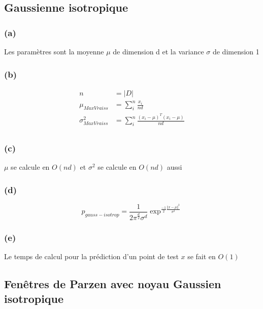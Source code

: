 \documentclass{article}
\begin{document}
	\subsection{Gaussienne isotropique}
	
	\subsubsection*{(a)}
	Les paramètres sont la moyenne $\mu$ de dimension d et la variance $\sigma$ de dimension 1 \\
	
	
	\subsubsection*{(b)}
	\begin{equation}
	\begin{split}
		n &= |D| \\
		\mu_{MaxVraiss} &= \sum_{i}^{n} \frac{x_{i}}{nd} \\
		\sigma_{MaxVraiss}^{2} &= \sum_{i}^{n} \frac{(x_{i}- \mu)^{T}(x_{i} - \mu)}{nd} \\
	\end{split}
	\end{equation}
	
	\subsubsection*{(c)}
	$\mu$ se calcule en $O(nd)$  et $\sigma^{2} $ se calcule en $O(nd)$ aussi\\
	\subsubsection*{(d)}
	
	\begin{equation}
		p_{gauss-isotrop} = 
		\frac{1}{2\pi^{\frac{d}{2}}\sigma^d}\exp^{\frac{-1}{2}\frac{\Vert x-\mu\Vert^2}{\sigma^2}}
	\end{equation}
	
	\subsubsection*{(e)}
	Le temps de calcul pour la prédiction d'un point de test $x$ se fait en $O(1)$
	
	\subsection{Fenêtres de Parzen avec noyau Gaussien isotropique}
	
\end{document}
